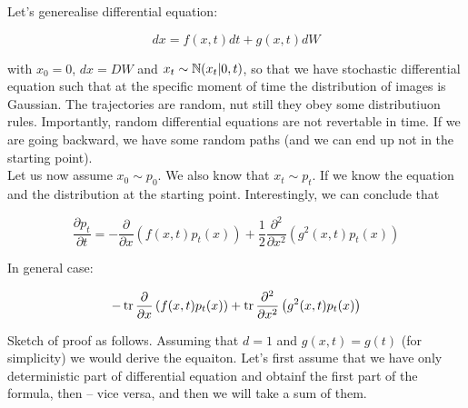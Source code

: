 Let's generealise differential equation: 

\[ 
    dx = f(x, t) dt + g(x, t) dW
\]

with $x_0 = 0$, $dx = DW$ and $x_t \sim \operatorname{\mathbb{N}}(x_t \vert 0, t)$, so that we have stochastic differential equation such that at the specific moment of time the distribution of images is Gaussian. The trajectories are random, nut still they obey some distributiuon rules. Importantly, random differential equations are not revertable in time. If we are going backward, we have some random paths (and we can end up not in the starting point). \\ 

Let us now assume $x_0 \sim p_0$. We also know that $x_t \sim p_t$. If we know the equation and the distribution at the starting point. Interestingly, we can conclude that \\ 

\begin{etheorem}
    \[ 
        \frac{\partial p_t}{\partial t} = - \frac{\partial}{\partial x} \left( f(x, t) p_t(x) \right) + \frac{1}{2} \frac{\partial^2}{\partial x^2} \left(g^2 (x, t) p_t(x) \right)
    \]

    In general case: 

    \[ 
        - \tr \frac{\partial}{\partial x} \left( f(x, t) p_t(x) \right) + \tr  \frac{\partial^2}{\partial x^2} \left(g^2 (x, t) p_t(x) \right)
    \]
\end{etheorem}

Sketch of proof as follows. Assuming that $d = 1$ and $g(x, t) = g(t)$ (for simplicity) we would derive the equaiton. Let's first assume that we have only deterministic part of differential equation and obtainf the first part of the formula, then -- vice versa, and then we will take a sum of them. 

